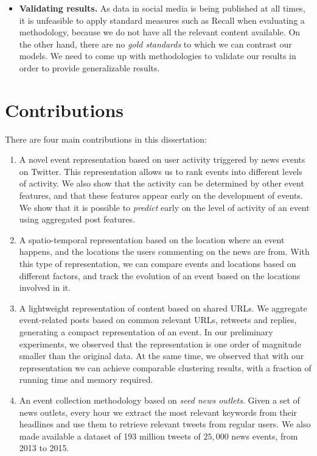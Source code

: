 \begin{itemize}
    \item {\bf Validating results.} 
    As data in social media is being published at all times, it is unfeasible to
    apply standard measures such as Recall when evaluating a methodology,
    because we do not have all the relevant content available.
    On the other hand, there are no {\em gold standards} to which we can
    contrast our models. 
    We need to come up with methodologies to validate our results in order to
    provide generalizable results.

    
\end{itemize}


\section*{Contributions} 

There are four main contributions in this dissertation:

\begin{enumerate}
\item A novel event representation based on user activity triggered by news
events on Twitter. 
%
This representation allows us to rank events into different levels of activity. 
%
We also show that the activity can be determined by other event features, and
that these features appear early on the development of events.
%
We show that it is possible to {\em predict} early on the level of activity of
an event using aggregated post features.

\item A spatio-temporal representation based on the location where an event
happens, and the locations the users commenting on the news are from.
%
With this type of representation, we can compare events and locations based on
different factors, and track the evolution of an event based on the locations
involved in it.

\item A lightweight representation of content based on shared URLs.
%
We aggregate event-related posts based on common relevant URLs, retweets and
replies, generating a compact representation of an event.
%
In our preliminary experiments, we observed that the representation is one order
of magnitude smaller than the original data.
%
At the same time, we observed that with our representation we can achieve
comparable clustering results, with a fraction of running time and memory
required.

\item An event collection methodology based on {\em seed news outlets}.
%
Given a set of news outlets, every hour we extract the most relevant keywords
from their headlines and use them to retrieve relevant tweets from regular
users.
%
We also made available a dataset of 193 million tweets of $25,000$ news events,
from 2013 to 2015.
\end{enumerate}

